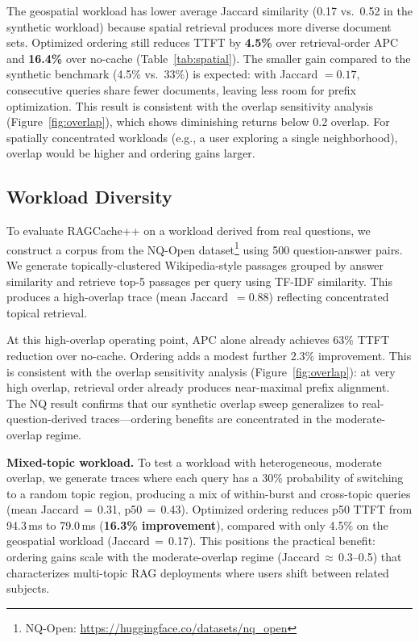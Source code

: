 \documentclass{article}
\begin{document}
The geospatial workload has lower average Jaccard similarity (0.17 vs.\ 0.52 in the synthetic workload) because spatial retrieval produces more diverse document sets. Optimized ordering still reduces TTFT by \textbf{4.5\%} over retrieval-order APC and \textbf{16.4\%} over no-cache (Table~\ref{tab:spatial}). The smaller gain compared to the synthetic benchmark (4.5\% vs.\ 33\%) is expected: with Jaccard $= 0.17$, consecutive queries share fewer documents, leaving less room for prefix optimization. This result is consistent with the overlap sensitivity analysis (Figure~\ref{fig:overlap}), which shows diminishing returns below 0.2 overlap. For spatially concentrated workloads (e.g., a user exploring a single neighborhood), overlap would be higher and ordering gains larger.

\subsection{Workload Diversity}
\label{sec:nq}

To evaluate RAGCache++ on a workload derived from real questions, we construct a corpus from the NQ-Open dataset\footnote{NQ-Open: \url{https://huggingface.co/datasets/nq_open}} using 500 question-answer pairs. We generate topically-clustered Wikipedia-style passages grouped by answer similarity and retrieve top-5 passages per query using TF-IDF similarity. This produces a high-overlap trace (mean Jaccard~$= 0.88$) reflecting concentrated topical retrieval.

At this high-overlap operating point, APC alone already achieves 63\% TTFT reduction over no-cache. Ordering adds a modest further 2.3\% improvement. This is consistent with the overlap sensitivity analysis (Figure~\ref{fig:overlap}): at very high overlap, retrieval order already produces near-maximal prefix alignment. The NQ result confirms that our synthetic overlap sweep generalizes to real-question-derived traces---ordering benefits are concentrated in the moderate-overlap regime.

\textbf{Mixed-topic workload.} To test a workload with heterogeneous, moderate overlap, we generate traces where each query has a 30\% probability of switching to a random topic region, producing a mix of within-burst and cross-topic queries (mean Jaccard\,$=$\,0.31, p50\,$=$\,0.43). Optimized ordering reduces p50 TTFT from 94.3\,ms to 79.0\,ms (\textbf{16.3\% improvement}), compared with only 4.5\% on the geospatial workload (Jaccard\,$=$\,0.17). This positions the practical benefit: ordering gains scale with the moderate-overlap regime (Jaccard\,$\approx$\,0.3--0.5) that characterizes multi-topic RAG deployments where users shift between related subjects.
\end{document}
